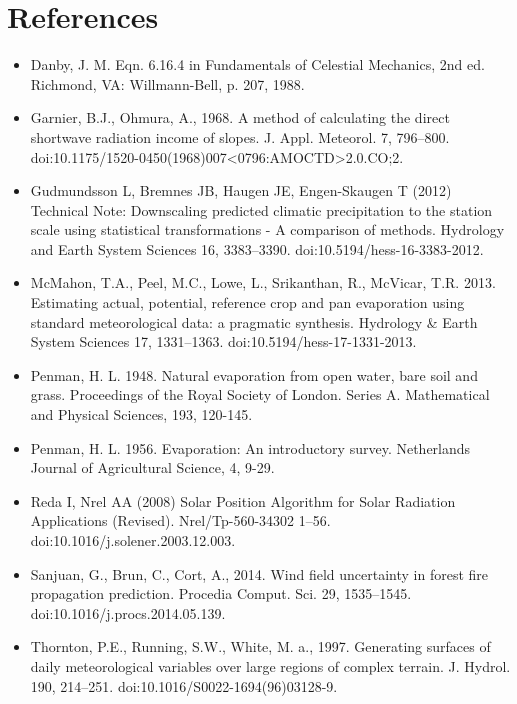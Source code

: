 \documentclass[11pt,a4paper]{article}
\begin{document}
\section{References}
\begin{itemize}
\item{Danby, J. M. Eqn. 6.16.4 in Fundamentals of Celestial Mechanics, 2nd ed. Richmond, VA: Willmann-Bell, p. 207, 1988.}

\item{Garnier, B.J., Ohmura, A., 1968. A method of calculating the direct shortwave radiation income of slopes. J. Appl. Meteorol. 7, 796–800. doi:10.1175/1520-0450(1968)007<0796:AMOCTD>2.0.CO;2.}

\item{Gudmundsson L, Bremnes JB, Haugen JE, Engen-Skaugen T (2012) Technical Note: Downscaling predicted climatic precipitation to the station scale using statistical transformations - A comparison of methods. Hydrology and Earth System Sciences 16, 3383–3390. doi:10.5194/hess-16-3383-2012.}

\item{McMahon, T.A., Peel, M.C., Lowe, L., Srikanthan, R., McVicar, T.R. 2013. Estimating actual, potential, reference crop and pan evaporation using standard meteorological data: a pragmatic synthesis. Hydrology \& Earth System Sciences 17, 1331–1363. doi:10.5194/hess-17-1331-2013.}

\item{Penman, H. L. 1948. Natural evaporation from open water, bare soil and grass. Proceedings of the Royal Society of London. Series A. Mathematical and Physical Sciences, 193, 120-145.}

\item{Penman, H. L. 1956. Evaporation: An introductory survey. Netherlands Journal of Agricultural Science, 4, 9-29.}

\item{Reda I, Nrel AA (2008) Solar Position Algorithm for Solar Radiation Applications (Revised). Nrel/Tp-560-34302 1–56. doi:10.1016/j.solener.2003.12.003.}

\item{Sanjuan, G., Brun, C., Cort, A., 2014. Wind field uncertainty in forest fire propagation prediction. Procedia Comput. Sci. 29, 1535–1545. doi:10.1016/j.procs.2014.05.139.}

\item{Thornton, P.E., Running, S.W., White, M. a., 1997. Generating surfaces of daily meteorological variables over large regions of complex terrain. J. Hydrol. 190, 214–251. doi:10.1016/S0022-1694(96)03128-9.}


\end{itemize}
\end{document}
